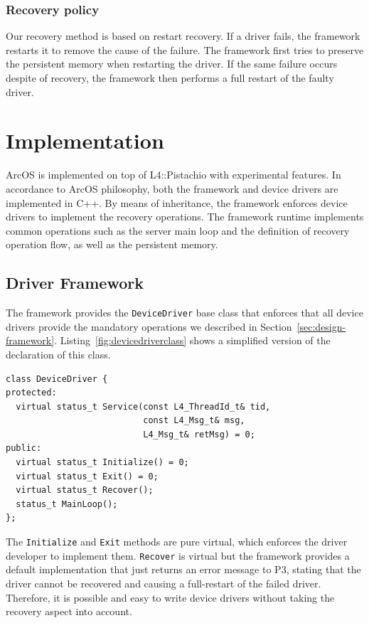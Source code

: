 \documentclass{report}
\begin{document}
\subsubsection{Recovery policy}

Our recovery method is based on restart recovery.  If a driver fails, the framework restarts it to remove the cause of the failure.  The framework first tries to preserve the persistent memory when restarting the driver.  If the same failure occurs despite of recovery, the framework then performs a full restart of the faulty driver.

\section{Implementation}
\label{s:impl}

ArcOS is implemented on top of L4::Pistachio\cite{L4X2} with experimental features. In accordance to ArcOS philosophy, both the framework and device drivers are implemented in C++.  By means of inheritance, the framework enforces device drivers to implement the recovery operations.  The framework runtime implements common operations such as the server main loop and the definition of recovery operation flow, as well as the persistent memory.

\subsection{Driver Framework}

The framework provides the \texttt{DeviceDriver} base class that enforces that all device drivers provide the mandatory operations we described in Section~\ref{sec:design-framework}. Listing~\ref{fig:devicedriverclass} shows a simplified version of the declaration of this class.

\begin{lstlisting}[style=nonumbers,caption=Simplified version of the DeviceDriver class declaration.,label=fig:devicedriverclass]
class DeviceDriver {
protected:
  virtual status_t Service(const L4_ThreadId_t& tid,
                           const L4_Msg_t& msg,
                           L4_Msg_t& retMsg) = 0;
public:
  virtual status_t Initialize() = 0;
  virtual status_t Exit() = 0;
  virtual status_t Recover();
  status_t MainLoop();
};
\end{lstlisting}

The \texttt{Initialize} and \texttt{Exit} methods are pure virtual, which enforces the driver developer to implement them. \texttt{Recover} is virtual but the framework provides a default implementation that just returns an error message to P3, stating that the driver cannot be recovered and causing a full-restart of the failed driver. Therefore, it is possible and easy to write device drivers without taking the recovery aspect into account.
\end{document}
